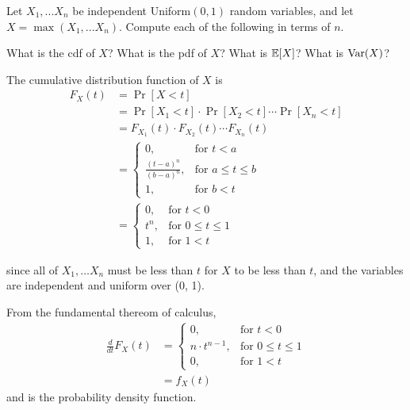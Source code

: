 \documentclass[11pt]{article}
\begin{document}
Let $X_1,...X_n$ be independent Uniform$(0,1)$ random variables, and let $X = 
\max(X_1,...X_n)$. Compute each of the following in terms of $n$.
\begin{Parts}
	\Part What is the cdf of $X$?
	\Part What is the pdf of $X$?
	\Part What is $\operatorname{\mathbb{E}}[X]$?
	\Part What is $\operatorname{Var}(X)$?
\end{Parts}

\begin{solution}

\begin{Parts}
    
\Part The cumulative distribution function of $X$ is
\[
    \begin{split}
        F_X(t) &= \Pr[X < t] \\
        &= \Pr[X_1 < t] \cdot \Pr[X_2 < t] \cdots \Pr[X_n < t] \\
        &= F_{X_1}(t) \cdot F_{X_2}(t) \cdots F_{X_n}(t) \\
        &= \begin{cases}
            0, & \text{for } t < a \\
            \frac{(t-a)^n}{(b-a)^n}, & \text{for } a \leq t \leq b \\
            1, & \text{for } b < t
        \end{cases} \\
        &= \begin{cases}
            0, & \text{for } t < 0 \\
            t^n, & \text{for } 0 \leq t \leq 1 \\
            1, & \text{for } 1 < t
        \end{cases}
    \end{split}
\]

since all of $X_1, \dots X_n$ must be less than $t$ for $X$ to be less than $t$,
and the variables are independent and uniform over (0, 1).

\Part From the fundamental thereom of calculus,
\[
    \begin{split}
        \frac{d}{dt} F_X(t) &= \begin{cases}
            0, & \text{for } t < 0 \\
            n \cdot t^{n-1}, & \text{for } 0 \leq t \leq 1 \\
            0, & \text{for } 1 < t
        \end{cases} \\
        &= f_X(t)
    \end{split}
\]
and is the probability density function. 


\end{Parts}
\end{solution}
\end{document}
